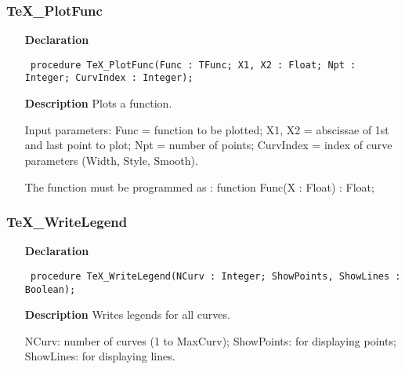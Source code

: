 \documentclass[12pt,a4paper,oneside]{report}
\newcommand{\declarationitem}[1]{\textbf{#1}}
\newcommand{\descriptiontitle}[1]{\textbf{#1}}
\newcommand{\code}[1]{\texttt{#1}}
\begin{document}
\subsubsection{TeX{\_}PlotFunc}
\label{utexplot-TeX_PlotFunc}
\begin{itemize}\item[\declarationitem{Declaration}\hfill]
	\begin{flushleft}
		\code{
			procedure TeX{\_}PlotFunc(Func : TFunc; X1, X2 : Float; Npt : Integer; CurvIndex : Integer);}
		
	\end{flushleft}
	
	\par
	\item[\descriptiontitle{Description}]
	Plots a function.
	
	Input parameters: Func = function to be plotted; X1, X2 = abscissae of 1st and last point to plot; Npt = number of points; CurvIndex = index of curve parameters (Width, Style, Smooth).
	
	The function must be programmed as : function Func(X : Float) : Float; 
\end{itemize}
\subsubsection{TeX{\_}WriteLegend}
\label{utexplot-TeX_WriteLegend}
\begin{itemize}\item[\declarationitem{Declaration}\hfill]
	\begin{flushleft}
		\code{
			procedure TeX{\_}WriteLegend(NCurv : Integer; ShowPoints, ShowLines : Boolean);}
		
	\end{flushleft}
	
	\par
	\item[\descriptiontitle{Description}]
	Writes legends for all curves.
	
	NCurv: number of curves (1 to MaxCurv); ShowPoints: for displaying points; ShowLines: for displaying lines.
	
\end{itemize}
\end{document}

